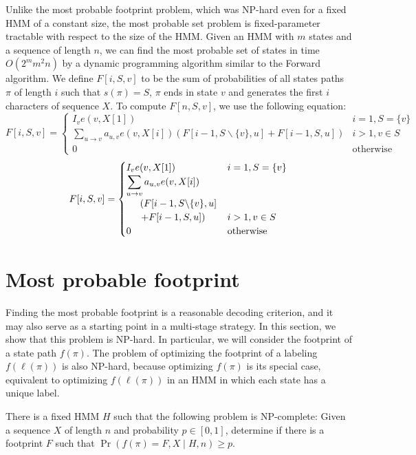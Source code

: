 \begin{reformulate*}
Unlike the most probable footprint problem, which was NP-hard even for
a fixed HMM of a constant size, the most probable set problem is
fixed-parameter tractable with respect to the size of the HMM. Given
an HMM with $m$ states and a sequence of length $n$, we can find the
most probable set of states in time $O(2^m m^2 n)$ by a dynamic
programming algorithm similar to the Forward algorithm.
We define $F[i,S,v]$ to be the sum of probabilities of all
states paths $\pi$ of length $i$ such that $s(\pi)=S$, $\pi$ ends in
state $v$ and generates the first $i$ characters of sequence $X$.
To compute $F[n,S,v]$, we use the following equation:
\ifx\settwocolumn\undefined
$$F[i,S,v] = \begin{cases}
I_{v}e(v,X[1])& i=1,S=\{v\}\\ 
\displaystyle \sum_{u\to v}a_{u,v}e(v,X[i])\left(F[i-1,S\backslash\{v\},u]
+ F[i-1,S,u]\right) & i>1, v\in S\\
0 & \mbox{otherwise}
\end{cases}$$
\else
$$F[i,S,v] = \begin{cases}
I_{v}e(v,X[1])& i=1,S=\{v\}\\ 
\displaystyle \sum_{u\to v}a_{u,v}e(v,X[i])\\\hspace{5mm}\left(F[i-1,S\backslash\{v\},u]\right.
\\\hspace{5mm}\left.
+ F[i-1,S,u]\right) & i>1, v\in S\\
0 & \mbox{otherwise}
\end{cases}$$
\fi

\end{reformulate*}
\section{Most probable footprint}
\begin{notmytext*}
\label{sec:footprint}

Finding the most probable
footprint is a reasonable decoding criterion,
and it may also serve as a starting point in a multi-stage
strategy. In this section, we show that this problem is
NP-hard. In particular, we will consider the footprint of a state path
$f(\pi)$. The problem of optimizing the footprint of a labeling
$f(\ell(\pi))$ is also NP-hard, because optimizing $f(\pi)$ is its special case, 
equivalent to optimizing $f(\ell(\pi))$ in an HMM in
which each state has a unique label.

\begin{theorem}
There is a fixed HMM $H$ such that the following problem is NP-complete:
Given a sequence $X$ of length $n$ and probability $p\in [0,1]$, determine
if there is a footprint $F$ such that $\Pr(f(\pi)=F,X\mid H,n)\ge p$.
\label{thm:foot}
\end{theorem}

\end{notmytext*}


